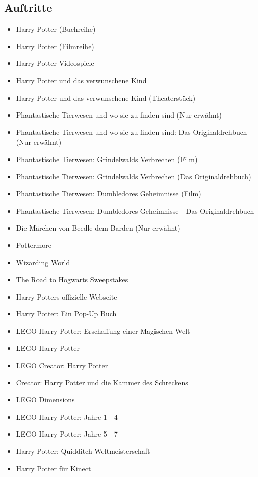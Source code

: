 \documentclass[a4paper, 10pt]{article}
\begin{document}
\subsection*{\Large Auftritte}
\vspace{10pt}
\begin{itemize}
    \item Harry Potter (Buchreihe)
    \item Harry Potter (Filmreihe)
    \item Harry Potter-Videospiele
    \item Harry Potter und das verwunschene Kind
    \item Harry Potter und das verwunschene Kind (Theaterstück)
    \item Phantastische Tierwesen und wo sie zu finden sind (Nur erwähnt)
    \item Phantastische Tierwesen und wo sie zu finden sind: Das Originaldrehbuch (Nur erwähnt)
    \item Phantastische Tierwesen: Grindelwalds Verbrechen (Film)
    \item Phantastische Tierwesen: Grindelwalds Verbrechen (Das Originaldrehbuch)
    \item Phantastische Tierwesen: Dumbledores Geheimnisse (Film)
    \item Phantastische Tierwesen: Dumbledores Geheimnisse - Das Originaldrehbuch
    \item Die Märchen von Beedle dem Barden (Nur erwähnt)
    \item Pottermore
    \item Wizarding World
    \item The Road to Hogwarts Sweepstakes
    \item Harry Potters offizielle Webseite
    \item Harry Potter: Ein Pop-Up Buch
    \item LEGO Harry Potter: Erschaffung einer Magischen Welt
    \item LEGO Harry Potter
    \item LEGO Creator: Harry Potter
    \item Creator: Harry Potter und die Kammer des Schreckens
    \item LEGO Dimensions
    \item LEGO Harry Potter: Jahre 1 - 4
    \item LEGO Harry Potter: Jahre 5 - 7
    \item Harry Potter: Quidditch-Weltmeisterschaft
    \item Harry Potter für Kinect

\end{itemize}
\end{document}
